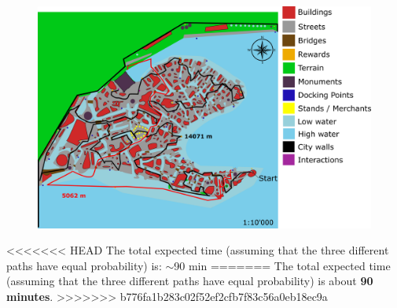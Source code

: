 \begin{itemize}
\begin{figure}[H]
    \centering
\includegraphics[scale=0.3]{Images/Diagrams/dynamiapath3.png}
\end{figure}
\end{itemize}

<<<<<<< HEAD
The total expected time (assuming that the three different paths have equal probability) is:  $\sim$90 min
=======
The total expected time (assuming that the three different paths have equal probability) is about \textbf{90 minutes}.
>>>>>>> b776fa1b283c02f52ef2cfb7f83c56a0eb18ec9a
